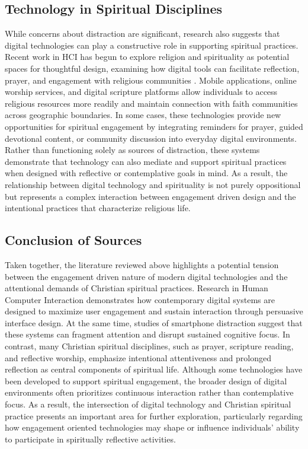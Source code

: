 \documentclass[12pt]{article}
\begin{document}
\subsection{Technology in Spiritual Disciplines}
While concerns about distraction are significant, research also suggests that digital technologies can play a constructive role in supporting spiritual practices. Recent work in HCI has begun to explore religion and spirituality as potential spaces for thoughtful design, examining how digital tools can facilitate reflection, prayer, and engagement with religious communities \cite{10.1145/3538706}. Mobile applications, online worship services, and digital scripture platforms allow individuals to access religious resources more readily and maintain connection with faith communities across geographic boundaries. In some cases, these technologies provide new opportunities for spiritual engagement by integrating reminders for prayer, guided devotional content, or community discussion into everyday digital environments. Rather than functioning solely as sources of distraction, these systems demonstrate that technology can also mediate and support spiritual practices when designed with reflective or contemplative goals in mind. As a result, the relationship between digital technology and spirituality is not purely oppositional but represents a complex interaction between engagement driven design and the intentional practices that characterize religious life.
\subsection{Conclusion of Sources}
Taken together, the literature reviewed above highlights a potential tension between the engagement driven nature of modern digital technologies and the attentional demands of Christian spiritual practices. Research in Human Computer Interaction demonstrates how contemporary digital systems are designed to maximize user engagement and sustain interaction through persuasive interface design. At the same time, studies of smartphone distraction suggest that these systems can fragment attention and disrupt sustained cognitive focus. In contrast, many Christian spiritual disciplines, such as prayer, scripture reading, and reflective worship, emphasize intentional attentiveness and prolonged reflection as central components of spiritual life. Although some technologies have been developed to support spiritual engagement, the broader design of digital environments often prioritizes continuous interaction rather than contemplative focus. As a result, the intersection of digital technology and Christian spiritual practice presents an important area for further exploration, particularly regarding how engagement oriented technologies may shape or influence individuals' ability to participate in spiritually reflective activities.
\end{document}
